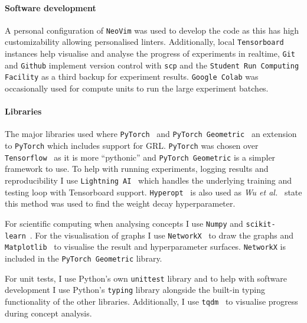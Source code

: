 \paragraph{Software development}

A personal configuration of \texttt{NeoVim} was used to develop the code as this has high customizability allowing personalised linters.
Additionally, local \texttt{Tensorboard}~\cite{tensorflow2015-whitepaper} instances help visualise and analyse the progress of experiments in realtime, \texttt{Git} and \texttt{Github} implement version control with \texttt{scp} and the \texttt{Student Run Computing Facility} as a third backup for experiment results.
\texttt{Google Colab} was occasionally used for compute units to run the large experiment batches.

\paragraph{Libraries}
\label{sec:libraries}

The major libraries used where \texttt{PyTorch}~\cite{paszke2019pytorch} and \texttt{PyTorch Geometric}~\cite{Fey/Lenssen/2019} an extension to \texttt{PyTorch} which includes support for GRL.
\texttt{PyTorch} was chosen over \texttt{Tensorflow}~\cite{tensorflow2015-whitepaper} as it is more ``pythonic'' and \texttt{PyTorch Geometric} is a simpler framework to use.
To help with running experiments, logging results and reproducibility I use \texttt{Lightning AI}~\cite{Falcon_PyTorch_Lightning_2019} which handles the underlying training and testing loop with Tensorboard support.
\texttt{Hyperopt}~\cite{bergstra2013making} is also used as \textit{Wu et al.}~\cite{wu2019simplifying} state this method was used to find the weight decay hyperparameter.

For scientific computing when analysing concepts I use \texttt{Numpy} and \texttt{scikit-learn}~\cite{scikit-learn}. For the visualisation of graphs I use \texttt{NetworkX}~\cite{SciPyProceedings_11} to draw the graphs and \texttt{Matplotlib}~\cite{Hunter:2007} to visualise the result and hyperparameter surfaces. \texttt{NetworkX} is included in the \texttt{PyTorch Geometric} library.

For unit tests, I use Python's own \texttt{unittest} library and to help with software development I use Python's \texttt{typing} library alongside the built-in typing functionality of the other libraries. Additionally, I use \texttt{tqdm}~\cite{casper_da_costa_luis_2023_7697295} to visualise progress during concept analysis.

